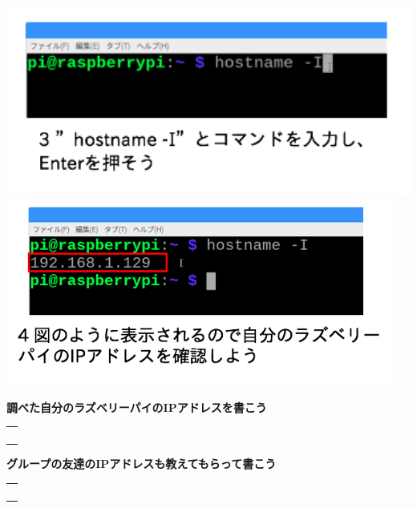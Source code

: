 \documentclass[a4paper,12pt,dvipdfmx]{jarticle}
\begin{document}
\clearpage

\centering

\includegraphics[width=13.799cm]{ome7-img010.png}
\centering
\includegraphics[width=12.771cm]{ome7-img009.png}
\flushleft


\bigskip


\bigskip


\bigskip


\bigskip


\bigskip

{\bfseries
	調べた自分のラズベリーパイのIPアドレスを書こう}

\bigskip


\centering
\begin{tabular}{|p{}|} \hline
	\\
	\\
	\\
	\\ \hline
\end{tabular}


\bigskip


\bigskip

\flushleft

{\bfseries
	グループの友達のIPアドレスも教えてもらって書こう}

\bigskip


\centering
\begin{tabular}{|p{}|} \hline
	\\
	\\
	\\
	\\ \hline
\end{tabular}
\end{document}
